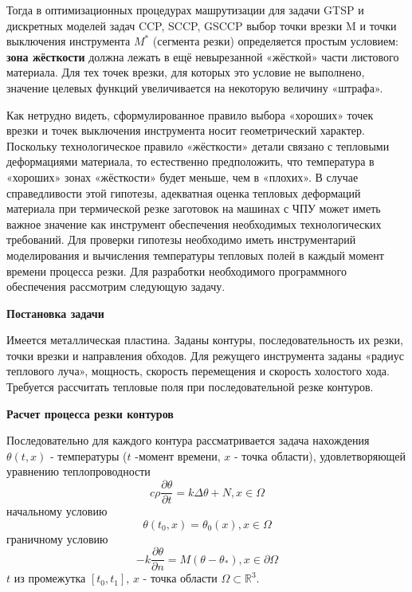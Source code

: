 \documentclass[12pt,twoside]{report}
\begin{document}
Тогда в оптимизационных процедурах машрутизации
для задачи GTSP  и дискретных моделей задач CCP, SCCP, GSCCP
выбор точки врезки M и точки выключения инструмента $M^*$
(сегмента резки) определяется простым условием:
{\bf зона жёсткости} должна лежать в ещё невырезанной
«жёсткой» части листового материала.
Для тех точек врезки, для которых это условие не выполнено,
значение целевых функций  увеличивается на некоторую величину «штрафа».

Как нетрудно видеть,
сформулированное правило выбора «хороших» точек врезки
и точек выключения инструмента носит геометрический характер.
Поскольку технологическое правило «жёсткости» детали
связано с тепловыми деформациями материала,
то естественно предположить,
что температура в «хороших» зонах «жёсткости» будет меньше,
чем в «плохих».
В случае справедливости этой гипотезы,
адекватная оценка тепловых деформаций материала
при термической резке заготовок на машинах с ЧПУ
может иметь важное значение как инструмент
обеспечения необходимых технологических требований.
Для проверки гипотезы необходимо иметь инструментарий
моделирования и вычисления температуры тепловых полей в
каждый момент времени процесса резки.
Для разработки необходимого программного
обеспечения рассмотрим следующую задачу.

{\bf Постановка задачи}

Имеется металлическая пластина.
Заданы контуры, последовательность их резки,
точки врезки и направления обходов.
Для режущего инструмента заданы «радиус теплового луча»,
мощность, скорость перемещения и скорость холостого хода.
Требуется рассчитать тепловые поля при
последовательной резке контуров.

{\bf Расчет процесса резки контуров}

Последовательно для каждого контура рассматривается задача нахождения
$\theta(t, x)$ - температуры
($t$ -момент времени,
$x$ - точка области), удовлетворяющей уравнению теплопроводности
\begin{equation}
c \rho \frac{\partial \theta}{\partial t}=k \Delta \theta +N, x \in \Omega
\end{equation}
начальному условию
\begin{equation}
  \theta(t_0, x)=\theta_0(x), x \in \Omega
\end{equation}
граничному условию
\begin{equation}
  -k \frac{\partial \theta}{\partial n}=M(\theta - \theta_*), x \in \partial \Omega
\end{equation}
$t$ из промежутка $[t_0, t_1]$,
$x$ - точка области
$\Omega \subset \mathbb R^3$.
\end{document}
